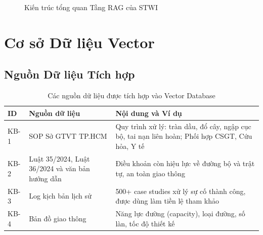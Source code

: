 \begin{figure}[H]
\caption{Kiến trúc tổng quan Tầng RAG của STWI}
\label{fig:rag_arch}
\end{figure}

\section{Cơ sở Dữ liệu Vector}

\subsection{Nguồn Dữ liệu Tích hợp}

\begin{table}[H]
\centering
\caption{Các nguồn dữ liệu được tích hợp vào Vector Database}
\label{tab:knowledge_sources}
\renewcommand{\arraystretch}{1.5}
\begin{tabular}{>{\centering}p{0.8cm} p{4cm} p{7cm}}
\toprule
\textbf{ID} & \textbf{Nguồn dữ liệu} & \textbf{Nội dung và Ví dụ} \\
\midrule
KB-1 & SOP Sở GTVT TP.HCM & Quy trình xử lý: tràn dầu, đổ cây, ngập cục bộ, tai nạn liên hoàn; Phối hợp CSGT, Cứu hỏa, Y tế \\
\rowcolor{rowgray}
KB-2 & Luật 35/2024, Luật 36/2024 và văn bản hướng dẫn & Điều khoản còn hiệu lực về đường bộ và trật tự, an toàn giao thông \\
KB-3 & Log kịch bản lịch sử & 500+ case studies xử lý sự cố thành công, được dùng làm tiền lệ tham khảo \\
\rowcolor{rowgray}
KB-4 & Bản đồ giao thông & Năng lực đường (capacity), loại đường, số làn, tốc độ thiết kế \\
\bottomrule
\end{tabular}
\end{table}

